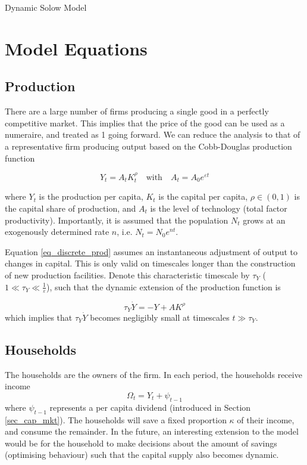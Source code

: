 \documentclass[11pt]{article}
\begin{document}
\begin{center}
\huge
Dynamic Solow Model
\end{center}

\section{Model Equations}

\subsection{Production}\label{sec_prod}

There are a large number of firms producing a single good in a perfectly competitive market. This implies that the price of the good can be used as a numeraire, and treated as 1 going forward. We can reduce the analysis to that of a representative firm producing output based on the Cobb-Douglas production function

\begin{equation}\label{eq_discrete_prod}
Y_t = A_tK_t^{\rho} \quad \textrm{with}\quad A_t=A_0e^{\varepsilon t}
\end{equation}

where $Y_t$ is the production per capita, $K_t$ is the capital per capita, $\rho\in (0,1)$ is the capital share of production, and $A_t$ is the level of technology (total factor productivity). Importantly, it is assumed that the population $N_t$ grows at an exogenously determined rate $n$, i.e. $N_t = N_0e^{nt}$.

Equation \eqref{eq_discrete_prod} assumes an instantaneous adjustment of output to changes in capital. This is only valid on timescales longer than the construction of new production facilities. Denote this characteristic timescale by $\tau_Y$ ($1\ll\tau_Y\ll\frac{1}{\varepsilon}$), such that the dynamic extension of the production function is

\begin{equation}\label{eq_dyn_prod}
\tau_Y \dot{Y} = -Y + AK^{\rho}
\end{equation}
which implies that $\tau_Y\dot{Y}$ becomes negligibly small at timescales $t\gg\tau_Y$.

\subsection{Households}\label{sec_hh}
The households are the owners of the firm. In each period, the households receive income
\begin{equation}\label{eq_hh_income}
\Omega_t = Y_t + \psi_{t-1}
\end{equation}
where $\psi_{t-1}$ represents a per capita dividend (introduced in Section \ref{sec_cap_mkt}). The households will save a fixed proportion $\kappa$ of their income, and consume the remainder. In the future, an interesting extension to the model would be for the household to make decisions about the amount of savings (optimising behaviour) such that the capital supply also becomes dynamic.
\end{document}
